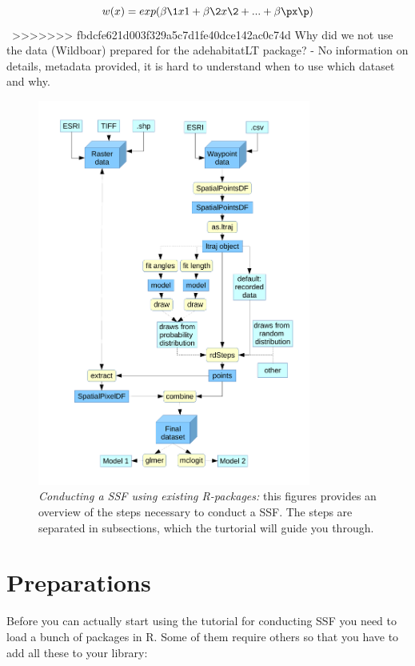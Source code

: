 \documentclass[11pt, a4paper]{article}\usepackage[]{graphicx}\usepackage[]{color}
\begin{document}
\[
\displaystyle w(x) = exp(\beta\1 x1 + \beta\2 x\2 + ... + \beta\px\p)
\]
\
>>>>>>> fbdcfe621d003f329a5c7d1fe40dce142ac0c74d
Why did we not use the data (Wildboar) prepared for the adehabitatLT package? - No information on details, metadata provided, it is hard to understand when to use which dataset and why.


\begin{figure} %
\captionsetup{width=0.8\textwidth}
\centering
\includegraphics[width=0.8\textwidth]{Flowchart.pdf} %
\caption{\emph{Conducting a SSF using existing R-packages:} this figures provides an overview of the steps necessary to conduct a SSF. The steps are separated in subsections, which the turtorial will guide you through.}
\label{fig:Flowchart}
\end{figure}




\section{Preparations}
Before you can actually start using the tutorial for conducting SSF you need to load a bunch of packages in R. Some of them require others so that you have to add all these to your library:
\end{document}
